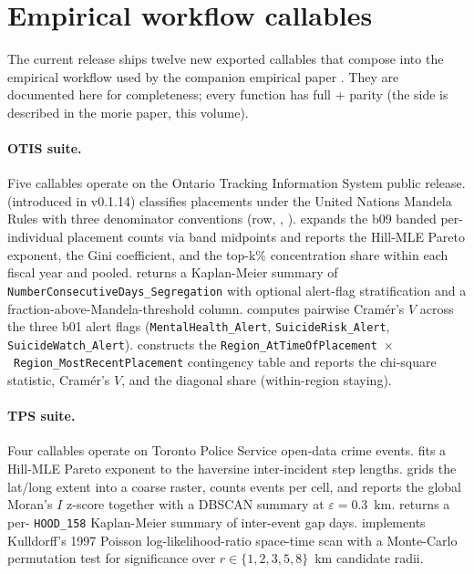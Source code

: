 \documentclass[article,shortnames,nojss]{jss}
\begin{document}
\section[Empirical workflow callables]{Empirical workflow callables}\label{sec:mrm-empirical-callables}

The current release ships twelve new exported callables that compose
into the empirical workflow used by the companion empirical paper
\citep{Ruhela2026MorieEmpirical}.  They are documented here for
completeness; every function has full  + 
parity (the  side is described in the morie
 paper, this volume).

\paragraph{OTIS suite.}  Five callables operate on the Ontario
Tracking Information System public release.  
(introduced in v0.1.14) classifies placements under the United Nations
Mandela Rules with three denominator conventions (row,
, ).
 expands the b09 banded
per-individual placement counts via band midpoints and reports the
Hill-MLE Pareto exponent, the Gini coefficient, and the top-k\%
concentration share within each fiscal year and pooled.
 returns a Kaplan-Meier summary of
\texttt{NumberConsecutiveDays\_Segregation} with optional alert-flag
stratification and a fraction-above-Mandela-threshold column.
 computes pairwise
Cram\'er's $V$ across the three b01 alert flags
(\texttt{MentalHealth\_Alert}, \texttt{SuicideRisk\_Alert},
\texttt{SuicideWatch\_Alert}).  
constructs the
\texttt{Region\_AtTimeOfPlacement}~$\times$~\texttt{Region\_MostRecentPlacement}
contingency table and reports the chi-square statistic, Cram\'er's
$V$, and the diagonal share (within-region staying).

\paragraph{TPS suite.}  Four callables operate on Toronto Police
Service open-data crime events.   fits
a Hill-MLE Pareto exponent to the haversine inter-incident step
lengths.   grids the lat/long
extent into a coarse raster, counts events per cell, and reports
the global Moran's $I$ z-score together with a DBSCAN summary at
$\varepsilon = 0.3$~km.
 returns a per-
\texttt{HOOD\_158} Kaplan-Meier summary of inter-event gap days.
 implements Kulldorff's 1997
Poisson log-likelihood-ratio space-time scan
\citep{kulldorff1997} with a Monte-Carlo permutation test for
significance over $r \in \{1, 2, 3, 5, 8\}$~km candidate radii.
\end{document}
